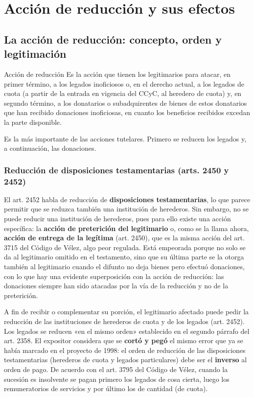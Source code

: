\documentclass[12pt,oneside]{book}
\begin{document}
\chapter[Acción de reducción]{Acción de reducción y sus efectos}

\section{La acción de reducción: concepto, orden y legitimación}

\begin{definition}{Acción de reducción}
Es la acción que tienen los legitimarios para atacar, en primer término, a los legados inoficiosos o, en el derecho actual, a los legados de cuota (a partir de la entrada en vigencia del CCyC, al heredero de cuota) y, en segundo término, a los donatarios o subadquirentes de bienes de estos donatarios que han recibido donaciones inoficiosas, en cuanto los beneficios recibidos excedan la parte disponible.
\end{definition}

Es la más importante de las acciones tutelares. Primero se reducen los legados y, a continuación, las donaciones.

\subsection{Reducción de disposiciones testamentarias (arts. 2450 y 2452)}

El art. 2452 habla de reducción de \textbf{disposiciones testamentarias}, lo que parece permitir que se reduzca también una institución de herederos. Sin embargo, no se puede reducir una institución de herederos, pues para ello existe una acción específica: la \textbf{acción de preterición del legitimario} o, como se la llama ahora, \textbf{acción de entrega de la legítima} (art. 2450), que es la misma acción del art. 3715 del Código de Vélez, algo peor regulada. Está empeorada porque no solo se da al legitimario omitido en el testamento, sino que su última parte se la otorga también al legitimario cuando el difunto no deja bienes pero efectuó donaciones, con lo que hay una evidente superposición con la acción de reducción: las donaciones siempre han sido atacadas por la vía de la reducción y no de la preterición.

A fin de recibir o complementar su porción, el legitimario afectado puede pedir la reducción de las instituciones de herederos de cuota y de los legados (art. 2452). Los legados se reducen «en el mismo orden» establecido en el segundo párrafo del art. 2358. El expositor considera que se \textbf{cortó y pegó} el mismo error que ya se había marcado en el proyecto de 1998: el orden de reducción de las disposiciones testamentarias (herederos de cuota y legados particulares) debe ser el \textbf{inverso} al orden de pago. De acuerdo con el art. 3795 del Código de Vélez, cuando la sucesión es insolvente se pagan primero los legados de cosa cierta, luego los remuneratorios de servicios y por último los de cantidad (de cuota).
\end{document}
